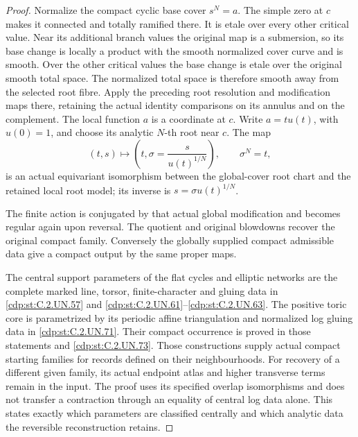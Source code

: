 \begin{proof}
Normalize the compact cyclic base cover
\(s^N=a\). The simple zero at \(c\)
makes it connected and totally ramified
there. It is etale over every other
critical value. Near its additional
branch values the original map is a
submersion, so its base change is locally
a product with the smooth normalized
cover curve and is smooth. Over the
other critical values the base change
is etale over the original smooth total
space. The normalized total space is
therefore smooth away from the selected
root fibre. Apply the preceding root
resolution and modification maps there,
retaining the actual identity comparisons
on its annulus and on the complement.
The local function \(a\) is a coordinate
at \(c\). Write \(a=t u(t)\), with
\(u(0)=1\), and choose its analytic
\(N\)-th root near \(c\). The map
\[
 (t,s)\longmapsto
 \left(t,\sigma=\frac{s}{u(t)^{1/N}}\right),
 \qquad \sigma^N=t,
\]
is an actual equivariant isomorphism
between the global-cover root chart
and the retained local root model;
its inverse is \(s=\sigma u(t)^{1/N}\).

The finite action is conjugated by that
actual global modification and becomes
regular again upon reversal. The quotient
and original blowdowns recover the
original compact family. Conversely the
globally supplied compact admissible
data give a compact output by the same
proper maps.

The central support parameters of the
flat cycles and elliptic networks are
the complete marked line, torsor,
finite-character and gluing data in
\ref{cdp:st:C.2.UN.57} and \ref{cdp:st:C.2.UN.61}--\ref{cdp:st:C.2.UN.63}. The positive
toric core is parametrized by its
periodic affine triangulation and
normalized log gluing data in \ref{cdp:st:C.2.UN.71}.
Their compact occurrence is proved
in those statements and \ref{cdp:st:C.2.UN.73}.
Those constructions supply actual
compact starting families for records
defined on their neighbourhoods.
For recovery of a different given
family, its actual endpoint atlas
and higher transverse terms remain
in the input. The proof uses its
specified overlap isomorphisms and
does not transfer a contraction
through an equality of central log
data alone. This states exactly
which parameters are classified
centrally and which analytic data
the reversible reconstruction retains.
\end{proof}


